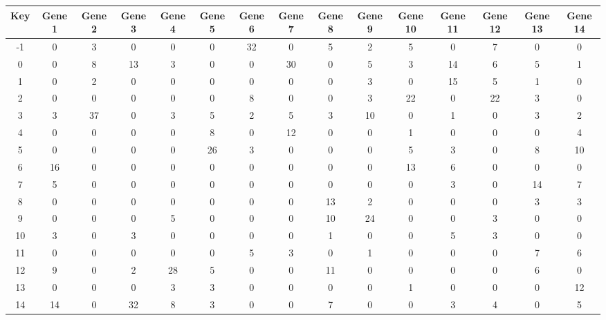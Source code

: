 \begin{tabular}{|c|c|c|c|c|c|c|c|c|c|c|c|c|c|c|}
\hline
Key & Gene 1 & Gene 2 & Gene 3 & Gene 4 & Gene 5 & Gene 6 & Gene 7 & Gene 8 & Gene 9 & Gene 10 & Gene 11 & Gene 12 & Gene 13 & Gene 14 \\
\hline
-1 & 0 & 3 & 0 & 0 & 0 & 32 & 0 & 5 & 2 & 5 & 0 & 7 & 0 & 0 \\
0 & 0 & 8 & 13 & 3 & 0 & 0 & 30 & 0 & 5 & 3 & 14 & 6 & 5 & 1 \\
1 & 0 & 2 & 0 & 0 & 0 & 0 & 0 & 0 & 3 & 0 & 15 & 5 & 1 & 0 \\
2 & 0 & 0 & 0 & 0 & 0 & 8 & 0 & 0 & 3 & 22 & 0 & 22 & 3 & 0 \\
3 & 3 & 37 & 0 & 3 & 5 & 2 & 5 & 3 & 10 & 0 & 1 & 0 & 3 & 2 \\
4 & 0 & 0 & 0 & 0 & 8 & 0 & 12 & 0 & 0 & 1 & 0 & 0 & 0 & 4 \\
5 & 0 & 0 & 0 & 0 & 26 & 3 & 0 & 0 & 0 & 5 & 3 & 0 & 8 & 10 \\
6 & 16 & 0 & 0 & 0 & 0 & 0 & 0 & 0 & 0 & 13 & 6 & 0 & 0 & 0 \\
7 & 5 & 0 & 0 & 0 & 0 & 0 & 0 & 0 & 0 & 0 & 3 & 0 & 14 & 7 \\
8 & 0 & 0 & 0 & 0 & 0 & 0 & 0 & 13 & 2 & 0 & 0 & 0 & 3 & 3 \\
9 & 0 & 0 & 0 & 5 & 0 & 0 & 0 & 10 & 24 & 0 & 0 & 3 & 0 & 0 \\
10 & 3 & 0 & 3 & 0 & 0 & 0 & 0 & 1 & 0 & 0 & 5 & 3 & 0 & 0 \\
11 & 0 & 0 & 0 & 0 & 0 & 5 & 3 & 0 & 1 & 0 & 0 & 0 & 7 & 6 \\
12 & 9 & 0 & 2 & 28 & 5 & 0 & 0 & 11 & 0 & 0 & 0 & 0 & 6 & 0 \\
13 & 0 & 0 & 0 & 3 & 3 & 0 & 0 & 0 & 0 & 1 & 0 & 0 & 0 & 12 \\
14 & 14 & 0 & 32 & 8 & 3 & 0 & 0 & 7 & 0 & 0 & 3 & 4 & 0 & 5 \\
\hline
\end{tabular}